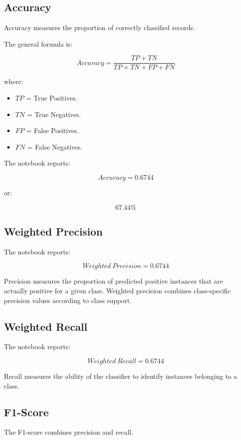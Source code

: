 \documentclass[12pt,a4paper]{article}
\begin{document}
\subsection{Accuracy}

Accuracy measures the proportion of correctly classified records.

The general formula is:

\[
Accuracy =
\frac{TP+TN}{TP+TN+FP+FN}
\]

where:

\begin{itemize}
    \item $TP$ = True Positives.
    \item $TN$ = True Negatives.
    \item $FP$ = False Positives.
    \item $FN$ = False Negatives.
\end{itemize}

The notebook reports:

\[
Accuracy = 0.6744
\]

or:

\[
\boxed{67.44\%}
\]



\subsection{Weighted Precision}

The notebook reports:

\[
Weighted\ Precision = 0.6744
\]

Precision measures the proportion of predicted positive instances that are actually positive for a given class. Weighted precision combines class-specific precision values according to class support.

\subsection{Weighted Recall}

The notebook reports:

\[
Weighted\ Recall = 0.6744
\]

Recall measures the ability of the classifier to identify instances belonging to a class.

\subsection{F1-Score}

The F1-score combines precision and recall.
\end{document}
